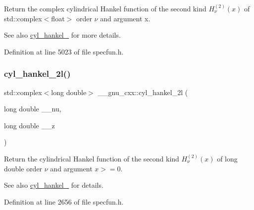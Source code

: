 Return the complex cylindrical Hankel function of the second kind $ H^{(2)}_\nu(x) $ of {\ttfamily std\+::complex$<$float$>$} order $ \nu $ and argument {\ttfamily x}.

\begin{DoxySeeAlso}{See also}
\hyperlink{group__mathsf__gnu_ga7ebc71dd48ac97255d72f5f5f43dfd8e}{cyl\+\_\+hankel\+\_} for more details. 
\end{DoxySeeAlso}


Definition at line 5023 of file specfun.\+h.

\mbox{\label{group__mathsf__gnu_ga4babb91ca6906f237e8bd1f0f1a10509}} 
\subsubsection{\texorpdfstring{cyl\+\_\+hankel\+\_\+2l()}{cyl\_hankel\_2l()}\hspace{0.1cm}{\footnotesize\ttfamily [1/2]}}
{\footnotesize\ttfamily std\+::complex$<$long double$>$ \+\_\+\+\_\+gnu\+\_\+cxx\+::cyl\+\_\+hankel\+\_\+2l (\begin{DoxyParamCaption}\item[{long double}]{\+\_\+\+\_\+nu,  }\item[{long double}]{\+\_\+\+\_\+z }\end{DoxyParamCaption})\hspace{0.3cm}{\ttfamily [inline]}}

Return the cylindrical Hankel function of the second kind $ H^{(2)}_\nu(x) $ of {\ttfamily long double} order $ \nu $ and argument $ x >= 0 $.

\begin{DoxySeeAlso}{See also}
\hyperlink{group__mathsf__gnu_ga7ebc71dd48ac97255d72f5f5f43dfd8e}{cyl\+\_\+hankel\+\_} for details. 
\end{DoxySeeAlso}


Definition at line 2656 of file specfun.\+h.

\mbox{\label{group__mathsf__gnu_ga1ac6434925254bd02e108f5a4e52b34d}} 
